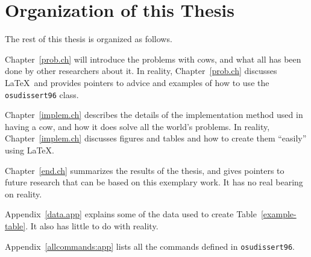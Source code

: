 \section{Organization of this Thesis}

The rest of this thesis is organized as follows. 

Chapter~\ref{prob.ch} will introduce the problems with cows, and what
all has been done by other researchers about it.  In reality,
Chapter~\ref{prob.ch} discusses \LaTeX\ and provides pointers to
advice and examples of how to use the {\tt osudissert96} class.

Chapter~\ref{implem.ch} describes the details of the implementation
method used in having a cow, and how it does solve all the world's
problems. In reality, Chapter~\ref{implem.ch} discusses figures and
tables and how to create them ``easily'' using \LaTeX.

Chapter~\ref{end.ch} summarizes the results of the thesis, and gives
pointers to future research that can be based on this exemplary work.
It has no real bearing on reality.

Appendix~\ref{data.app} explains some of the data used to create
Table~\ref{example-table}. It also has little to do with reality.

Appendix~\ref{allcommands:app} lists all the commands defined in
{\tt osudissert96}.
